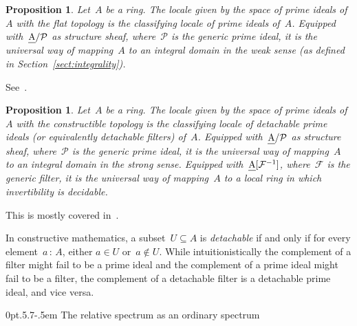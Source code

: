 \documentclass[10pt,reqno,a4paper]{amsbook}
\makeatletter
\theoremstyle{definition}
\theoremstyle{plain}
\newtheorem{prop}[defn]{Proposition}
\theoremstyle{remark}
\newcommand{\F}{\mathcal{F}}
\renewcommand{\P}{\mathcal{P}}
\let\oldul\ul
\renewcommand{\ul}[1]{\text{\oldul{$#1$}}}
\newcommand{\?}{\,{:}\,}
\renewcommand{\_}{\mathpunct{.}\,}
\renewenvironment{proof}[1][\proofname]{\par
  \pushQED{\qed}%
  \normalfont \topsep6\p@\@plus6\p@\relax
  \trivlist
  \item[\hskip\labelsep
        \itshape
    #1\@addpunct{.}]\ignorespaces
}{%
  \popQED\endtrivlist\@endpefalse
}
\def\subsection{\@startsection{subsection}{2}%
  {0pt}{.5\linespacing\@plus.7\linespacing}{-.5em}%
  {\normalfont\bfseries}}
\makeatother
\begin{document}
\begin{prop}Let~$A$ be a ring. The locale given by the space of prime ideals
of~$A$ with the flat topology is the classifying locale of prime ideals of~$A$.
Equipped with~$\ul{A}/\P$ as structure sheaf, where~$\P$ is the generic prime
ideal, it is the universal way of mapping~$A$ to an integral domain in the weak
sense (as defined in Section~\ref{sect:integrality}).
\end{prop}

\begin{proof}See~\cite[Proposition~4.5]{johnstone:rings-fields-and-spectra}.\end{proof}

\begin{prop}Let~$A$ be a ring. The locale given by the space of prime ideals
of~$A$ with the constructible topology is the classifying locale of detachable
prime ideals (or equivalently detachable filters) of~$A$. Equipped
with~$\ul{A}/\P$ as structure sheaf, where~$\P$ is the generic prime ideal, it
is the universal way of mapping~$A$ to an integral domain in the strong sense.
Equipped with~$\ul{A}[\F^{-1}]$, where~$\F$ is the generic filter, it is the
universal way of mapping~$A$ to a local ring in which invertibility is
decidable.\end{prop}

\begin{proof}This is mostly covered
in~\cite[p.~253]{johnstone:rings-fields-and-spectra}.\end{proof}

In constructive mathematics, a subset~$U \subseteq A$ is \emph{detachable} if
and only if for every element~$a\?A$, either $a \in U$ or~$a \not\in U$. While
intuitionistically the complement of a filter might fail to be a prime ideal
and the complement of a prime ideal might fail to be a filter, the complement
of a detachable filter is a detachable prime ideal, and vice versa.


\subsection{The relative spectrum as an ordinary spectrum}\label{sect:rel-spec-as-ordinary-spec}
\end{document}
